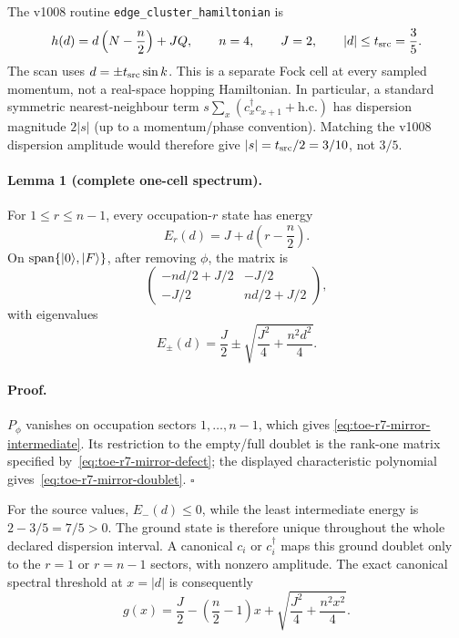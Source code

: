 The v1008 routine \texttt{edge\_cluster\_hamiltonian} is
\begin{equation}
 h(d)=d\left(N-\frac n2\right)+JQ,\qquad
 n=4,\qquad J=2,\qquad |d|\leq t_{\rm src}=\frac35.
 \label{eq:toe-r7-mirror-hd}
\end{equation}
The scan uses $d=\pm t_{\rm src}\sin k$.  This is a separate Fock cell at every
sampled momentum, not a real-space hopping Hamiltonian.  In particular, a
standard symmetric nearest-neighbour term
$s\sum_x(c_x^\dagger c_{x+1}+\mathrm{h.c.})$ has dispersion magnitude
$2|s|$ (up to a momentum/phase convention).  Matching the v1008 dispersion
amplitude would therefore give $|s|=t_{\rm src}/2=3/10$, not $3/5$.

\paragraph{Lemma 1 (complete one-cell spectrum).}
For $1\leq r\leq n-1$, every occupation-$r$ state has energy
\begin{equation}
 E_r(d)=J+d\left(r-\frac n2\right).
 \label{eq:toe-r7-mirror-intermediate}
\end{equation}
On $\operatorname{span}\{|0\rangle,|F\rangle\}$, after removing $\phi$, the matrix is
\begin{equation}
 \begin{pmatrix}
 -nd/2+J/2&-J/2\\
 -J/2&nd/2+J/2
 \end{pmatrix},
\end{equation}
with eigenvalues
\begin{equation}
 E_\pm(d)=\frac J2\pm
 \sqrt{\frac{J^2}{4}+\frac{n^2d^2}{4}}.
 \label{eq:toe-r7-mirror-doublet}
\end{equation}

\paragraph{Proof.}
$P_\phi$ vanishes on occupation sectors $1,\dots,n-1$, which gives
\eqref{eq:toe-r7-mirror-intermediate}.  Its restriction to the empty/full doublet is the
rank-one matrix specified by~\eqref{eq:toe-r7-mirror-defect}; the displayed characteristic
polynomial gives~\eqref{eq:toe-r7-mirror-doublet}. \hfill$\square$

For the source values, $E_-(d)\leq0$, while the least intermediate energy is
$2-3/5=7/5>0$.  The ground state is therefore unique throughout the whole
declared dispersion interval.  A canonical $c_i$ or $c_i^\dagger$ maps this
ground doublet only to the $r=1$ or $r=n-1$ sectors, with nonzero amplitude.
The exact canonical spectral threshold at $x=|d|$ is consequently
\begin{equation}
 g(x)=\frac J2-\left(\frac n2-1\right)x
      +\sqrt{\frac{J^2}{4}+\frac{n^2x^2}{4}}.
 \label{eq:toe-r7-mirror-gx}
\end{equation}

